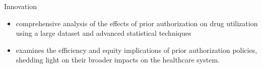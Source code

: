 \begin{frame}{Innovation}
    \begin{itemize}
        \item comprehensive analysis of the effects of prior authorization on drug utilization using a large dataset and advanced statistical techniques
        \item examines the efficiency and equity implications of prior authorization policies, shedding light on their broader impacts on the healthcare system.
    \end{itemize}
\end{frame}